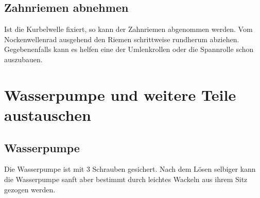 \documentclass[twoside,a4paper]{refart}
\begin{document}
\subsection{Zahnriemen abnehmen}
Ist die Kurbelwelle fixiert, so kann der Zahnriemen abgenommen werden. Vom Nockenwellenrad ausgehend den Riemen schrittweise rundherum abziehen. Gegebenenfalls kann es helfen eine der Umlenkrollen oder die Spannrolle schon auszubauen.

\section{Wasserpumpe und weitere Teile austauschen}
\subsection{Wasserpumpe}
Die Wasserpumpe ist mit 3 Schrauben gesichert. Nach dem Lösen selbiger kann die Wasserpumpe sanft aber bestimmt durch leichtes Wackeln aus ihrem Sitz gezogen werden.
 
\end{document}

